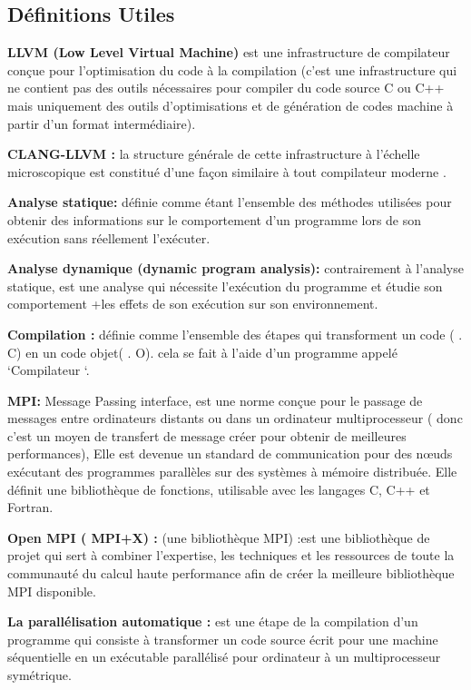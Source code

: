 \documentclass[12pt,titlepage]{article}
\begin{document}
\subsection{Définitions Utiles}
	

\textbf{ LLVM (Low Level Virtual Machine)} est une infrastructure de compilateur conçue pour l'optimisation du code à la compilation (c’est une infrastructure qui ne contient pas des outils nécessaires pour compiler du code source C ou C++ mais uniquement des outils d’optimisations et de génération de codes machine à partir d’un format intermédiaire).
              
\textbf{CLANG-LLVM :} la structure générale de cette infrastructure à l’échelle microscopique est constitué d’une façon similaire à tout compilateur moderne .

\textbf{ Analyse statique:} définie comme étant l'ensemble des méthodes utilisées pour obtenir des informations sur le comportement d’un programme lors de son exécution sans réellement l’exécuter.

\textbf{  Analyse dynamique (dynamic program analysis): } contrairement à l’analyse statique, est une analyse qui nécessite l’exécution du programme et étudie son comportement +les effets de son exécution sur son environnement.

\textbf{ Compilation : } définie comme l’ensemble des étapes qui transforment un code ( . C) en un code objet( . O). cela se fait à l’aide d’un programme appelé ‘Compilateur ‘.

\textbf{ MPI:} Message Passing interface, est une norme conçue pour le passage de messages entre ordinateurs distants ou dans un ordinateur multiprocesseur ( donc c’est un moyen de transfert de message créer pour obtenir de meilleures performances), Elle est devenue un standard de communication pour des nœuds exécutant des programmes parallèles sur des systèmes à mémoire distribuée. Elle définit une bibliothèque de fonctions, utilisable avec les langages C, C++ et Fortran.

\textbf{ Open MPI ( MPI+X) :} (une bibliothèque MPI) :est une bibliothèque de projet qui sert à combiner l'expertise, les techniques et les ressources de toute la communauté du calcul haute performance afin de créer la meilleure bibliothèque MPI disponible.


\textbf{ La parallélisation automatique :} est une étape de la compilation d'un programme qui consiste à transformer un code source écrit pour une machine séquentielle en un exécutable parallélisé pour ordinateur à un multiprocesseur symétrique.
\end{document}
